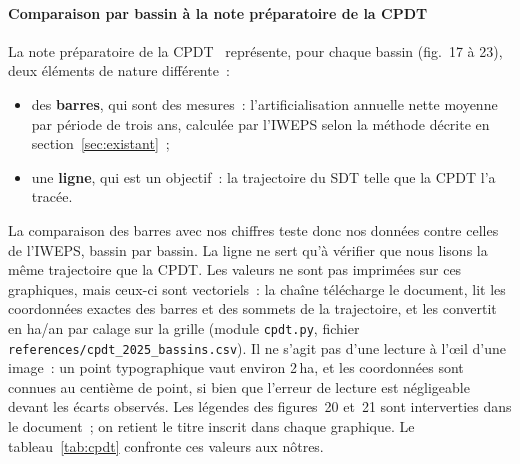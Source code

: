 \documentclass[11pt,a4paper]{report}
\newcommand{\fichier}[1]{\texttt{\small #1}}
\begin{document}
\paragraph{Comparaison par bassin à la note préparatoire de la CPDT}
\label{sec:cpdt}
La note préparatoire de la CPDT~\citep{cpdt_prep2025} représente, pour chaque bassin (fig.~17 à 23), deux éléments de nature différente~:
\begin{itemize}
\item des \textbf{barres}, qui sont des mesures~: l'artificialisation annuelle nette moyenne par période de trois ans, calculée par l'IWEPS selon la méthode décrite en section~\ref{sec:existant}~;
\item une \textbf{ligne}, qui est un objectif~: la trajectoire du SDT telle que la CPDT l'a tracée.
\end{itemize}
La comparaison des barres avec nos chiffres teste donc nos données contre celles de l'IWEPS, bassin par bassin. La ligne ne sert qu'à vérifier que nous lisons la même trajectoire que la CPDT. Les valeurs ne sont pas imprimées sur ces graphiques, mais ceux-ci sont vectoriels~: la chaîne télécharge le document, lit les coordonnées exactes des barres et des sommets de la trajectoire, et les convertit en ha/an par calage sur la grille (module \fichier{cpdt.py}, fichier \fichier{references/cpdt\_2025\_bassins.csv}). Il ne s'agit pas d'une lecture à l'\oe il d'une image~: un point typographique vaut environ 2\,ha, et les coordonnées sont connues au centième de point, si bien que l'erreur de lecture est négligeable devant les écarts observés. Les légendes des figures~20 et~21 sont interverties dans le document~; on retient le titre inscrit dans chaque graphique. Le tableau~\ref{tab:cpdt} confronte ces valeurs aux nôtres.

\begin{table}[ht]
\centering\footnotesize
\caption{Artificialisation annuelle nette par bassin (ha/an) et ratio à la trajectoire~: note préparatoire de la CPDT (données IWEPS au 01/01/2024) et présente étude (définition principale). $^{a}$ Référence implicite de la trajectoire tracée par la CPDT (pente $\times$ 29)~; $^{b}$ moyenne lue sur le graphique du SDT~; $^{c}$ moyenne 2021-2023 rapportée à la trajectoire du SDT au milieu de la période, comme le fait la CPDT.}
\label{tab:cpdt}
\resizebox{\textwidth}{!}{}
\end{table}
\end{document}
